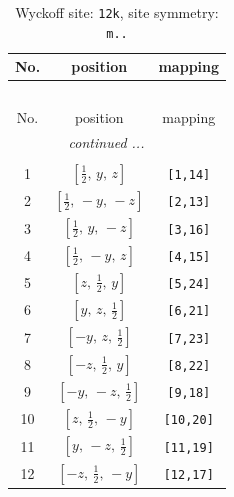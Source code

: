 \documentclass[fleqn,8pt]{jsarticle}
\begin{document}
\begin{longtable}{ccc}
\caption{Wyckoff site: {\tt 12k}, site symmetry: {\tt m..}}
 \\
 \hline \hline
No. & position & mapping \\ \hline \endfirsthead

\multicolumn{2}{l}{\tablename\ \thetable{}} \\
 \hline \hline
No. & position & mapping \\ \hline \endhead

 \hline \hline
\multicolumn{2}{r}{\footnotesize\it continued ...} \\ \endfoot

 \hline \hline
\multicolumn{2}{r}{} \\ \endlastfoot

1 & $\left[ \frac{1}{2},\, y,\, z \right]$ & {\tt [1,14]} \\ \hline
2 & $\left[ \frac{1}{2},\, - y,\, - z \right]$ & {\tt [2,13]} \\ \hline
3 & $\left[ \frac{1}{2},\, y,\, - z \right]$ & {\tt [3,16]} \\ \hline
4 & $\left[ \frac{1}{2},\, - y,\, z \right]$ & {\tt [4,15]} \\ \hline
5 & $\left[ z,\, \frac{1}{2},\, y \right]$ & {\tt [5,24]} \\ \hline
6 & $\left[ y,\, z,\, \frac{1}{2} \right]$ & {\tt [6,21]} \\ \hline
7 & $\left[ - y,\, z,\, \frac{1}{2} \right]$ & {\tt [7,23]} \\ \hline
8 & $\left[ - z,\, \frac{1}{2},\, y \right]$ & {\tt [8,22]} \\ \hline
9 & $\left[ - y,\, - z,\, \frac{1}{2} \right]$ & {\tt [9,18]} \\ \hline
10 & $\left[ z,\, \frac{1}{2},\, - y \right]$ & {\tt [10,20]} \\ \hline
11 & $\left[ y,\, - z,\, \frac{1}{2} \right]$ & {\tt [11,19]} \\ \hline
12 & $\left[ - z,\, \frac{1}{2},\, - y \right]$ & {\tt [12,17]} \\
\end{longtable}
\renewcommand{\arraystretch}{1.2}
\end{document}
